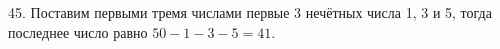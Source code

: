 45. Поставим первыми тремя числами первые 3 нечётных числа 1, 3 и 5, тогда последнее число равно $50-1-3-5=41.$\\
